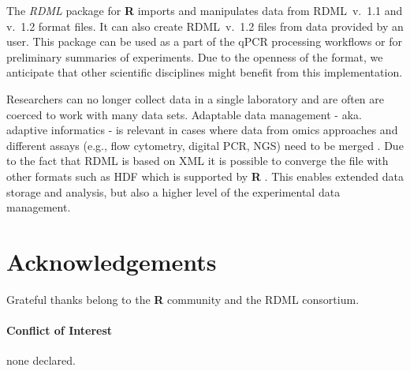 \documentclass{bioinfo}
\begin{document}
	The \textit{RDML} package for \textbf{R} imports and manipulates data 
from RDML~v.~1.1 and v.~1.2 format files. It can also create RDML~v.~1.2 files 
from data provided by an user. This package can be used as a part of the qPCR 
processing workflows or for preliminary summaries of experiments. Due to the 
openness of the format, we anticipate that other scientific disciplines might 
benefit from this implementation.

Researchers can no longer collect data in a single laboratory and are often are 
coerced to work with many data sets. Adaptable data management - aka. adaptive 
informatics - is relevant in cases where data from omics approaches and 
different assays (e.g., flow cytometry, digital PCR, NGS) need to be merged 
\cite{baker_quantitative_2012}. Due to the fact that RDML is based on XML it is 
possible to converge the file with other formats such as HDF 
\cite{millard_adaptive_2011} which is supported by \textbf{R} \cite{Fischer_HDF5}. This enables extended data storage 
and analysis, but also a higher level of the experimental data management.

\section{Acknowledgements}
Grateful thanks belong to the \textbf{R} community and the RDML consortium.
	
\paragraph{Conflict of Interest\textcolon} none declared.

%
%
%
%
%
%

%

\end{document}
